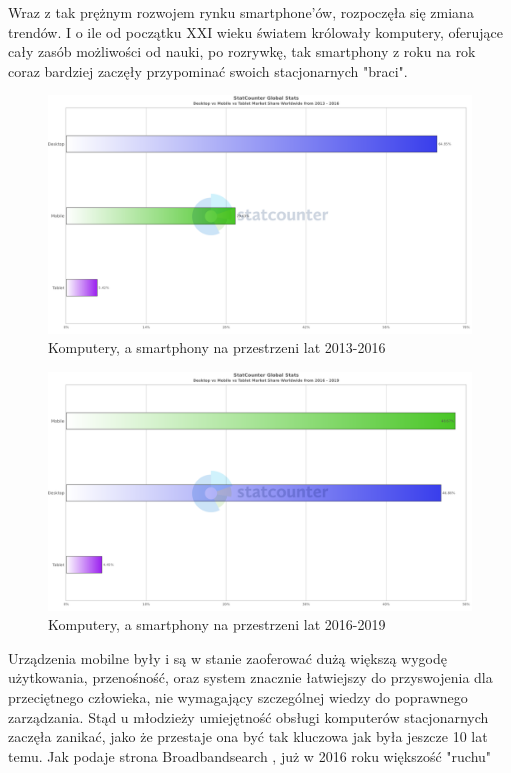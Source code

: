 \documentclass[12pt, a4paper]{article}
\begin{document}
\begin{sloppypar}
{{    Wraz z tak prężnym rozwojem rynku smartphone'ów, rozpoczęła się zmiana trendów.
    I o ile od początku XXI wieku światem królowały komputery, oferujące cały zasób 
    możliwości od nauki, po rozrywkę, tak smartphony z roku na rok coraz bardziej 
    zaczęły przypominać swoich stacjonarnych "braci". 
    \begin{figure}[H]
      \centering
      \includegraphics[width=.9\textwidth]{systems_chart1.png}
      \caption{Komputery, a smartphony na przestrzeni lat 2013-2016}
      \label{fig:2013}
    \end{figure} 
    \begin{figure}[H]
      \centering
      \includegraphics[width=.9\textwidth]{systems_chart2.png}
      \caption{Komputery, a smartphony na przestrzeni lat 2016-2019}
      \label{fig:2016}
    \end{figure} 
    Urządzenia mobilne były i są w stanie zaoferować dużą większą wygodę 
    użytkowania, przenośność, oraz system znacznie łatwiejszy do przyswojenia dla 
    przeciętnego człowieka, nie wymagający szczególnej wiedzy do poprawnego
    zarządzania. Stąd u młodzieży umiejętność obsługi komputerów stacjonarnych
    zaczęła zanikać, jako że przestaje ona być tak kluczowa jak była jeszcze 10 lat
    temu. Jak podaje strona Broadbandsearch \cite{dvm}, już w 2016 roku większość "ruchu"
}}
\end{sloppypar}
\end{document}
